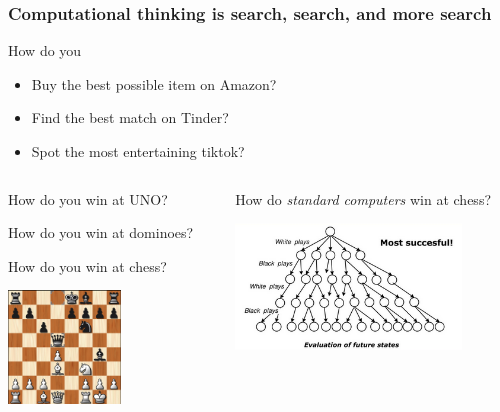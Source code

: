 \documentclass[xcolor=x11names,handout]{beamer}
\begin{document}
\begin{frame}
\frametitle{Computational thinking is search, search, and more search}
\pause

How do \alert{you}
\begin{itemize}
 \item Buy the best possible item on Amazon?
 \item Find the best match on Tinder?
 \item Spot the most entertaining tiktok?
\end{itemize}						\pause
\bigskip

\begin{columns}
\begin{column}{0.45\textwidth}
How do \alert{you} win at UNO?		\pause
\bigskip

How do \alert{you} win at dominoes?		\pause
\bigskip

How do \alert{you} win at chess?

\centering
\includegraphics[width=30mm]{img/chess.png}
\end{column}							\pause

\begin{column}{0.5\textwidth}
How do \textit{standard \alert{computers}} win at chess?
\bigskip								\pause

\centering
\includegraphics[width=60mm]{img/chess_brute.png}
\bigskip
\end{column}
\end{columns}
\end{frame}
\end{document}
